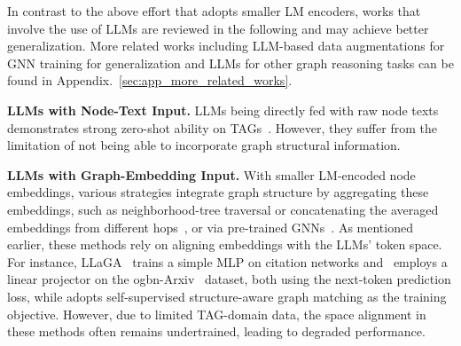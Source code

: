 In contrast to the above effort that adopts smaller LM encoders, works that involve the use of LLMs are reviewed in the following and may achieve better generalization. More related works including LLM-based data augmentations for GNN training for generalization and LLMs for other graph reasoning tasks can be found in Appendix.~\ref{sec:app_more_related_works}.



\textbf{LLMs with Node-Text Input.} LLMs being directly fed with raw node texts demonstrates strong zero-shot ability on TAGs~\cite{chen2024exploring, huang2024can, li2024similarity}. However, they suffer from the limitation of not being able to incorporate graph structural information. %

\textbf{LLMs with Graph-Embedding Input.} With smaller LM-encoded node embeddings, various strategies integrate graph structure by aggregating these embeddings, such as neighborhood-tree traversal or concatenating the averaged embeddings from different hops~\cite{chen2024llaga, tang2024graphgpt, luo2024enhance}, or via pre-trained GNNs~\cite{zhang2024graphtranslator, wang2024llms}. As mentioned earlier, these methods rely on aligning embeddings with the LLMs' token space. For instance, LLaGA~\cite{chen2024llaga} trains a simple MLP on citation networks and~\cite{wang2024llms} employs a linear projector on the ogbn-Arxiv~\cite{hu2020open} dataset, both using the next-token prediction loss, while \cite{tang2024graphgpt} adopts self-supervised structure-aware graph matching as the training objective. However, due to limited TAG-domain data, the space alignment in these methods often remains undertrained, leading to degraded performance. 

